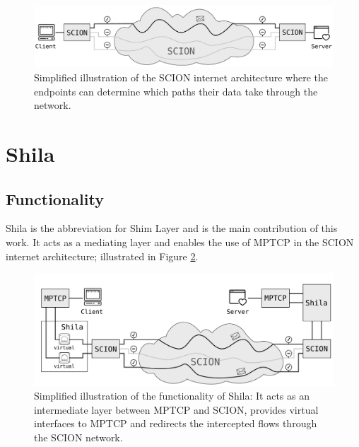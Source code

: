 \begin{figure}[H]
	\begin{center}
		\def\svgwidth{1\textwidth}
		\includegraphics[scale=0.28]{../illustrations/introduction/SCION.pdf}
		\caption[Caption for the list of figures.]{Simplified illustration of the SCION internet architecture where the endpoints can determine which paths their data take through the network.}
		\label{fig:IntroSCION}
	\end{center}
\end{figure}

\section{Shila}

\subsection*{Functionality}

Shila is the abbreviation for Shim Layer and is the main contribution of this work. It acts as a mediating layer and enables the use of MPTCP in the SCION internet architecture; illustrated in Figure \ref{fig:IntroRoleOfShila}. 

\begin{figure}[H]
	\begin{center}
		\def\svgwidth{1\textwidth}
		\includegraphics[scale=0.28]{../illustrations/introduction/Shila.pdf} 
		\caption[Caption for the list of figures.]{Simplified illustration of the functionality of Shila: It acts as an intermediate layer between MPTCP and SCION, provides virtual interfaces to MPTCP and redirects the intercepted flows through the SCION network.}
		\label{fig:IntroRoleOfShila}
	\end{center}
\end{figure}

